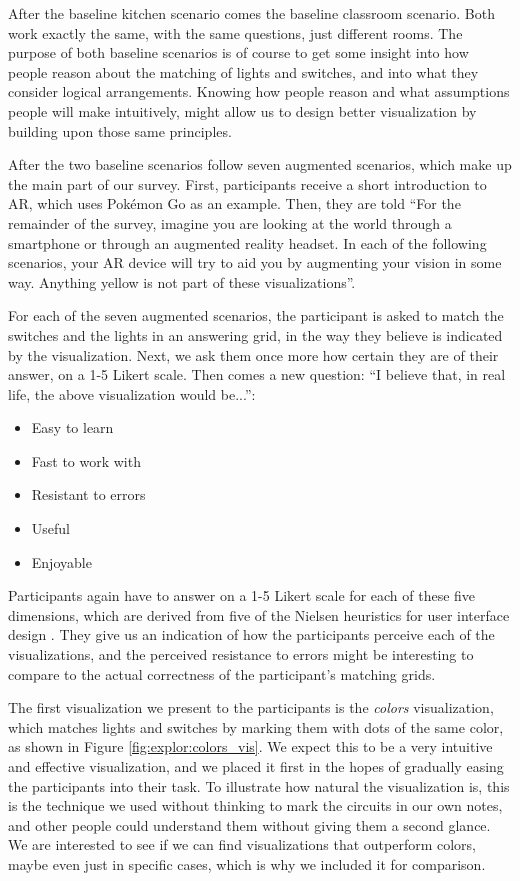 After the baseline kitchen scenario comes the baseline classroom scenario. Both work exactly the same, with the same questions, just different rooms. The purpose of both baseline scenarios is of course to get some insight into how people reason about the matching of lights and switches, and into what they consider logical arrangements. Knowing how people reason and what assumptions people will make intuitively, might allow us to design better visualization by building upon those same principles.

After the two baseline scenarios follow seven augmented scenarios, which make up the main part of our survey. First, participants receive a short introduction to AR, which uses Pokémon Go as an example. Then, they are told ``For the remainder of the survey, imagine you are looking at the world through a smartphone or through an augmented reality headset. In each of the following scenarios, your AR device will try to aid you by augmenting your vision in some way. Anything yellow is not part of these visualizations''.

For each of the seven augmented scenarios, the participant is asked to match the switches and the lights in an answering grid, in the way they believe is indicated by the visualization. Next, we ask them once more how certain they are of their answer, on a 1-5 Likert scale. Then comes a new question: ``I believe that, in real life, the above visualization would be...'':
\begin{itemize}
    \item Easy to learn
    \item Fast to work with
    \item Resistant to errors
    \item Useful
    \item Enjoyable
\end{itemize}
Participants again have to answer on a 1-5 Likert scale for each of these five dimensions, which are derived from five of the Nielsen heuristics for user interface design \cite{nielsen1990heuristic}. They give us an indication of how the participants perceive each of the visualizations, and the perceived resistance to errors might be interesting to compare to the actual correctness of the participant's matching grids.

The first visualization we present to the participants is the \textit{colors} visualization, which matches lights and switches by marking them with dots of the same color, as shown in Figure \ref{fig:explor:colors_vis}. We expect this to be a very intuitive and effective visualization, and we placed it first in the hopes of gradually easing the participants into their task. To illustrate how natural the visualization is, this is the technique we used without thinking to mark the circuits in our own notes, and other people could understand them without giving them a second glance. We are interested to see if we can find visualizations that outperform colors, maybe even just in specific cases, which is why we included it for comparison.


